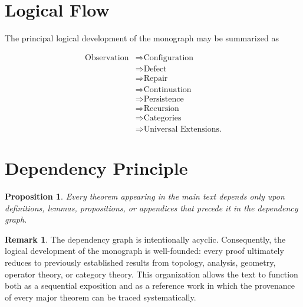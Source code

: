 \documentclass[11pt]{book}
\numberwithin{equation}{chapter}
\theoremstyle{definition}
\newtheorem{remark}[definition]{Remark}
\theoremstyle{plain}
\newtheorem{proposition}[definition]{Proposition}
\begin{document}

\section{Logical Flow}

The principal logical development of the monograph may be summarized as

\[
\begin{aligned}
\text{Observation}
&\Longrightarrow
\text{Configuration}
\\[2mm]
&\Longrightarrow
\text{Defect}
\\[2mm]
&\Longrightarrow
\text{Repair}
\\[2mm]
&\Longrightarrow
\text{Continuation}
\\[2mm]
&\Longrightarrow
\text{Persistence}
\\[2mm]
&\Longrightarrow
\text{Recursion}
\\[2mm]
&\Longrightarrow
\text{Categories}
\\[2mm]
&\Longrightarrow
\text{Universal Extensions.}
\end{aligned}
\]


\section{Dependency Principle}

\begin{proposition}

Every theorem appearing in the main text depends only upon definitions,
lemmas, propositions, or appendices that precede it in the dependency
graph.

\end{proposition}


\begin{remark}

The dependency graph is intentionally acyclic. Consequently, the logical
development of the monograph is well-founded: every proof ultimately
reduces to previously established results from topology, analysis,
geometry, operator theory, or category theory. This organization allows
the text to function both as a sequential exposition and as a reference
work in which the provenance of every major theorem can be traced
systematically.

\end{remark}
\end{document}
